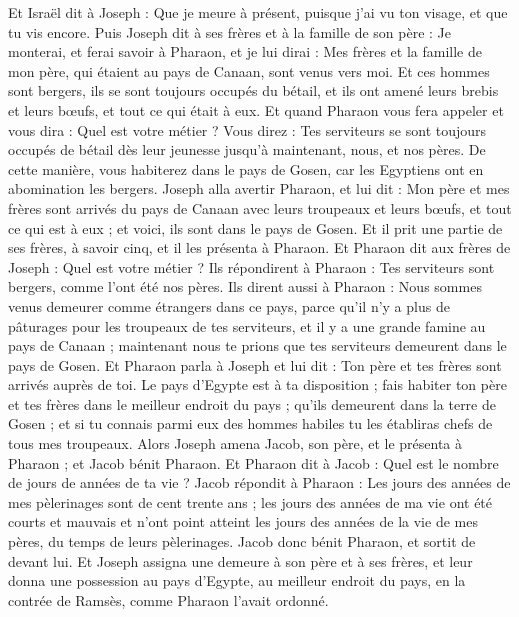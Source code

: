\begin{multicols}{2}
Et Israël dit à Joseph : Que je meure à présent, puisque j'ai vu ton visage, et que tu vis encore.
Puis Joseph dit à ses frères et à la famille de son père : Je monterai, et ferai savoir à Pharaon, et je lui dirai : Mes frères et la famille de mon père, qui étaient au pays de Canaan, sont venus vers moi.
Et ces hommes sont bergers, ils se sont toujours occupés du bétail, et ils ont amené leurs brebis et leurs bœufs, et tout ce qui était à eux.
Et quand Pharaon vous fera appeler et vous dira : Quel est votre métier ?
Vous direz : Tes serviteurs se sont toujours occupés de bétail dès leur jeunesse jusqu'à maintenant, nous, et nos pères. De cette manière, vous habiterez dans le pays de Gosen, car les Egyptiens ont en abomination les bergers.
\VerseOne{}Joseph alla avertir Pharaon, et lui dit : Mon père et mes frères sont arrivés du pays de Canaan avec leurs troupeaux et leurs bœufs, et tout ce qui est à eux ; et voici, ils sont dans le pays de Gosen.
Et il prit une partie de ses frères, à savoir cinq, et il les présenta à Pharaon.
Et Pharaon dit aux frères de Joseph : Quel est votre métier ? Ils répondirent à Pharaon : Tes serviteurs sont bergers, comme l'ont été nos pères.
Ils dirent aussi à Pharaon : Nous sommes venus demeurer comme étrangers dans ce pays, parce qu'il n'y a plus de pâturages pour les troupeaux de tes serviteurs, et il y a une grande famine au pays de Canaan ; maintenant nous te prions que tes serviteurs demeurent dans le pays de Gosen.
Et Pharaon parla à Joseph et lui dit : Ton père et tes frères sont arrivés auprès de toi.
Le pays d'Egypte est à ta disposition ; fais habiter ton père et tes frères dans le meilleur endroit du pays ; qu'ils demeurent dans la terre de Gosen ; et si tu connais parmi eux des hommes habiles tu les établiras chefs de tous mes troupeaux.
Alors Joseph amena Jacob, son père, et le présenta à Pharaon ; et Jacob bénit Pharaon.
Et Pharaon dit à Jacob : Quel est le nombre de jours de années de ta vie ?
Jacob répondit à Pharaon : Les jours des années de mes pèlerinages sont de cent trente ans ; les jours des années de ma vie ont été courts et mauvais et n'ont point atteint les jours des années de la vie de mes pères, du temps de leurs pèlerinages.
Jacob donc bénit Pharaon, et sortit de devant lui.
Et Joseph assigna une demeure à son père et à ses frères, et leur donna une possession au pays d'Egypte, au meilleur endroit du pays, en la contrée de Ramsès, comme Pharaon l'avait ordonné.

\end{multicols}
